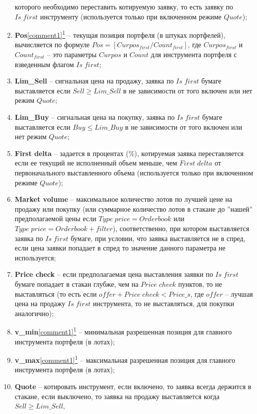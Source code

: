 \begin{enumerate}
		которого необходимо переставить котируемую заявку, то есть заявку по $Is \; first$ инструменту (используется только при включенном режиме $Quote$);
	\item \textbf{Pos}\hyperref[comment1]{\ref{comment1}\textsuperscript{1}} -- текущая позиция портфеля (в штуках портфелей), вычисляется по формуле
		$Pos=[Curpos_{first} / Count_{first}]$, где $Curpos_{first}$ и $Count_{first}$ -- это параметры $Curpos$ и $Count$ для инструмента портфеля с взведенным флагом
		$Is \; first$;
	\item \textbf{Lim\_Sell} -- сигнальная цена на продажу, заявка по $Is \; first$ бумаге выставляется если $Sell \geq Lim\_Sell$ в не зависимости от того включен или нет
		режим $Quote$;
	\item \textbf{Lim\_Buy} -- сигнальная цена на покупку, заявка по $Is \; first$ бумаге выставляется если $Buy \leq Lim\_Buy$ в не зависимости от того включен или нет
		режим $Quote$;
	\item \textbf{First delta} -- задается в процентах (\%), котируемая заявка переставляется если ее текущий не исполненный объем меньше, чем $First \; delta$ от
		первоначального выставленного объема (используется только при включенном режиме $Quote$);
	\item \textbf{Market volume} -- максимальное количество лотов по лучшей цене на продажу или покупку (или суммарное количество лотов в стакане до
		''нашей'' предполагаемой цены если $Type \; price = Orderbook$ или $Type \; price = Orderbook + filter$), соответственно, при котором выставляется заявка по $Is \; first$
		бумаге, при условии, что заявка выставляется не в спред, если цена заявки попадает в спред то значение данного параметра не используется;
	\item \textbf{Price check} -- если предполагаемая цена выставления заявки по $Is \; first$ бумаге попадает в стакан глубже, чем на $Price \; check$
		пунктов, то не выставляться (то есть если $offer + Price \; check < Price\_s$, где $offer$ --
		лучшая цена на продажу $Is \; first$ инструмента, то не выставляться, для покупки аналогично);
	\item \textbf{v\_min}\hyperref[comment1]{\ref{comment1}\textsuperscript{1}} -- минимальная разрешенная позиция для главного инструмента портфеля (в лотах);
	\item \textbf{v\_max}\hyperref[comment1]{\ref{comment1}\textsuperscript{1}} -- максимальная разрешенная позиция для главного инструмента портфеля (в лотах);
	\item \textbf{Quote} -- котировать инструмент, если включено, то заявка всегда держится в стакане, если выключено, то заявка на продажу выставляется когда $Sell \geq Lim\_Sell$,

\end{enumerate}
